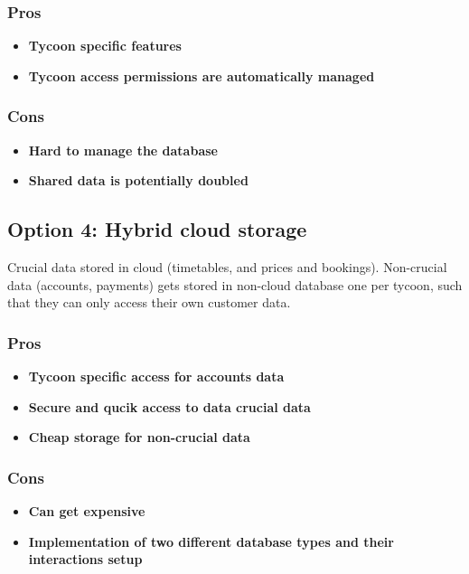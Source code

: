 \subsubsection*{Pros}
\begin{itemize}[noitemsep]
    \item \textbf{Tycoon specific features} 
    \item \textbf{Tycoon access permissions are automatically managed} 
\end{itemize}

\subsubsection*{Cons}
\begin{itemize}[noitemsep]
    \item \textbf{Hard to manage the database} 
    \item \textbf{Shared data is potentially doubled} 
\end{itemize}

\subsection*{Option 4: Hybrid cloud storage}
Crucial data stored in cloud (timetables, and prices and bookings). Non-crucial data (accounts, payments) gets stored in non-cloud database one per tycoon, such that they can only access their own customer data.

\subsubsection*{Pros}
\begin{itemize}[noitemsep]
    \item \textbf{Tycoon specific access for accounts data} 
    \item \textbf{Secure and qucik access to data crucial data} 
    \item \textbf{Cheap storage for non-crucial data} 
\end{itemize}

\subsubsection*{Cons}
\begin{itemize}[noitemsep]
    \item \textbf{Can get expensive} 
    \item \textbf{Implementation of two different database types and their interactions setup}
\end{itemize}

